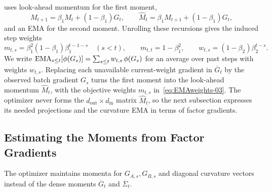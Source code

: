  uses look-ahead momentum for the first moment,
\[
  M_{t+1}=\beta_1M_t+(1-\beta_1)G_t,
  \qquad
  \widehat M_t=\beta_1M_{t+1}+(1-\beta_1)G_t,
\]
and an EMA for the second moment. Unrolling these recursions
gives the induced step weights
\begin{equation}\label{eq:EMAweights-03}
  m_{t,s}=\beta_1^2(1-\beta_1)\beta_1^{t-1-s}
  \quad(s<t),
  \qquad
  m_{t,t}=1-\beta_1^2,
  \qquad
  w_{t,s}=(1-\beta_2)\beta_2^{t-s}.
\end{equation}
We write $\operatorname{EMA}_{s\le t}[\phi(G_s)]=\sum_{s\le t}w_{t,s}\,\phi(G_s)$ for an
average over past steps with weights $w_{t,s}$. Replacing each unavailable
current-weight gradient in $\overline G_t$ by the observed batch gradient
$G_s$ turns the first moment into the look-ahead momentum $\widehat M_t$,
with the objective weights $m_{t,s}$ in~\eqref{eq:EMAweights-03}. The
optimizer never forms the $d_{\mathrm{out}}\times d_{\mathrm{in}}$ matrix
$\widehat M_t$, so the next subsection expresses its needed projections and
the curvature EMA in terms of factor gradients.

\subsection{Estimating the Moments from Factor Gradients}
\label{sec:weighted-estimation-03}

The optimizer maintains momenta for $G_{A,s},G_{B,s}$ and diagonal
curvature vectors instead of the dense moments $\overline G_t$ and
$\overline\Sigma_t$.

